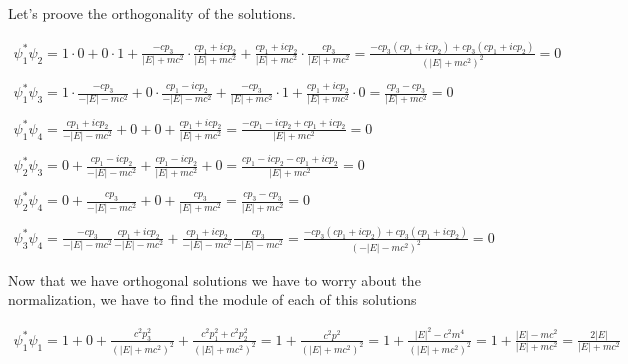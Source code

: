 Let's proove the orthogonality of the solutions.


\begin{equation}
  \begin{array}{c}
    \psi_1^* \psi_2 = 1 \cdot 0 + 0 \cdot 1 + \frac{-cp_3}{|E|+mc^2} \cdot \frac{cp_1+icp_2}{|E|+mc^2} + \frac{cp_1+icp_2}{|E|+mc^2} \cdot \frac{cp_3}{|E|+mc^2} = \frac{-cp_3(cp_1+icp_2)+cp_3(cp_1+icp_2)}{(|E|+mc^2)^2} = 0
    \\

    \\
    \psi_1^* \psi_3 = 1 \cdot \frac{-cp_3}{-|E|-mc^2} + 0 \cdot \frac{cp_1-icp_2}{-|E|-mc^2} + \frac{-cp_3}{|E|+mc^2} \cdot 1 + \frac{cp_1+icp_2}{|E|+mc^2} \cdot 0 = \frac{cp_3-cp_3}{|E|+mc^2} = 0
    \\

    \\
    \psi_1^* \psi_4 = \frac{cp_1+icp_2}{-|E|-mc^2} + 0 + 0 + \frac{cp_1+icp_2}{|E|+mc^2} = \frac{-cp_1-icp_2+cp_1+icp_2}{|E|+mc^2} = 0
    \\

    \\
    \psi_2^* \psi_3 = 0 + \frac{cp_1-icp_2}{-|E|-mc^2} + \frac{cp_1-icp_2}{|E|+mc^2} + 0 = \frac{cp_1-icp_2-cp_1+icp_2}{|E|+mc^2} = 0
    \\

    \\
    \psi_2^* \psi_4 = 0 + \frac{cp_3}{-|E|-mc^2} + 0 + \frac{cp_3}{|E|+mc^2} = \frac{cp_3-cp_3}{|E|+mc^2} = 0
    \\

    \\
    \psi_3^* \psi_4 = \frac{-cp_3}{-|E|-mc^2}\frac{cp_1+icp_2}{-|E|-mc^2} + \frac{cp_1+icp_2}{-|E|-mc^2}\frac{cp_3}{-|E|-mc^2} = \frac{-cp_3(cp_1+icp_2)+cp_3(cp_1+icp_2)}{(-|E|-mc^2)^2} = 0
  \end{array}
\end{equation}

Now that we have orthogonal solutions we have to worry about the normalization, we have to find the module of each of this solutions

\begin{equation}
  \begin{array}{c}
    \psi_1^*\psi_1 = 1 + 0 + \frac{c^2p_3^2}{(|E|+mc^2)^2}+\frac{c^2p_1^2+c^2p_2^2}{(|E|+mc^2)^2} = 1 + \frac{c^2p^2}{(|E|+mc^2)^2} = 1 + \frac{|E|^2-c^2m^4}{(|E|+mc^2)^2} = 1 + \frac{|E|-mc^2}{|E|+mc^2} = \frac{2|E|}{|E|+mc^2}
  \end{array}
\end{equation}

